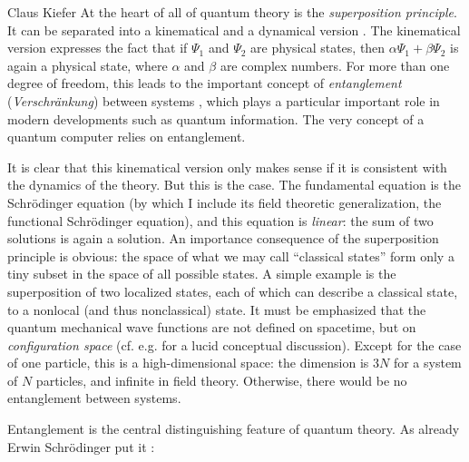 \begin{artengenv}{Claus Kiefer}
At the heart of all of quantum theory is the {\em superposition
  principle}. It can be separated into a kinematical and a dynamical
version \parencite{joos_decoherence_2003}. The kinematical version expresses the fact that if
$\Psi_1$ and $\Psi_2$ are physical states, then 
$\alpha\Psi_1+\beta\Psi_2$ is again a physical state, where $\alpha$
and $\beta$ are complex numbers.  
For more than one degree of freedom, this leads to the important
concept of
{\em entanglement} ({\em Verschr\"ankung}) between systems \parencite{kiefer_albert_2015},
which plays a particular important role in modern developments
such as quantum information. The very concept of a quantum computer
relies on entanglement. 

It is clear that this kinematical version only makes sense if it is
consistent with the dynamics of the theory. But this is the case. The
fundamental equation is the Schr\"odinger equation (by which I include
its field theoretic generalization, the functional Schr\"odinger
equation), and this equation is {\em linear}: the sum of two
  solutions is again a solution. An importance consequence of the
  superposition principle is obvious: the space of what we may call 
``classical states'' form only a tiny subset in the space of all
possible states. A simple example is the superposition of two
localized states, each of which can describe a classical state, to a
nonlocal (and thus nonclassical) state. It must be emphasized that the
quantum mechanical wave functions are not defined on spacetime, but on
{\em configuration space} (cf. e.g. \cite{zeh_strange_2016} for a lucid conceptual
discussion). Except for the case of one particle, this is a
high-dimensional space: the dimension is $3N$ for a system of $N$
particles, and infinite in field theory.
Otherwise, there would be no entanglement between systems.

Entanglement is the central distinguishing feature of quantum theory.
As already Erwin Schr\"odinger put it \parencite[p.~555]{schrodinger_discussion_1935}:



\end{artengenv}
